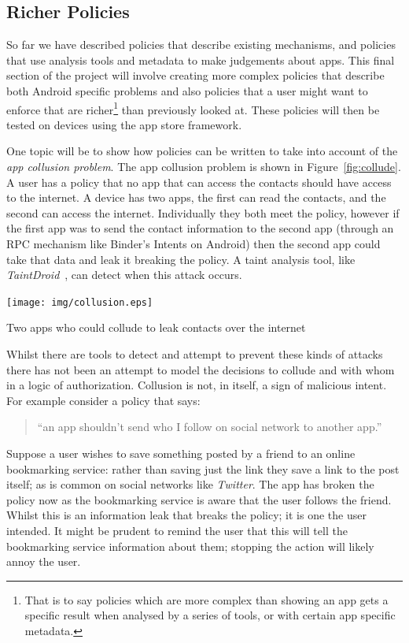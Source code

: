 \documentclass[a4paper]{article}
\begin{document}
\subsection{Richer Policies}

So far we have described policies that describe existing mechanisms, and
policies that use analysis tools and metadata to make judgements about apps.
This final section of the project will involve creating more complex policies
that describe both Android specific problems and also policies that a user might
want to enforce that are richer\footnote{That is to say policies which are more
  complex than showing an app gets a specific result when analysed by a series
  of tools, or with certain app specific metadata.} than previously looked at.
These policies will then be tested on devices using the app store framework.

One topic will be to show how policies can be written to take into account of
the \emph{app collusion problem}.  The app collusion problem is shown in
Figure~\ref{fig:collude}.  A user has a policy that no app that can access the
contacts should have access to the internet.  A device has two apps, the first
can read the contacts, and the second can access the internet.  Individually
they both meet the policy, however if the first app was to send the contact
information to the second app (through an \ac{RPC} mechanism like Binder's
Intents on Android) then the second app could take that data and leak it
breaking the policy.  A taint analysis tool, like
\emph{TaintDroid}~\cite{Enck:2010uw}, can detect when this attack occurs.

\begin{marginfigure}
  \texttt{[image: img/collusion.eps]}
  \caption{Two apps who could collude to leak contacts over the internet}
  \label{fig:collude}
\end{marginfigure}

Whilst there are tools to detect and attempt to prevent these kinds of attacks
there has not been an attempt to model the decisions to collude and with whom in
a logic of authorization.  Collusion is not, in itself, a sign of malicious
intent.  For example consider a policy that says:
\begin{quote}
  ``an app shouldn't send who I follow on social network to another app.''
\end{quote}
Suppose a user wishes to save something posted by a friend to an online
bookmarking service: rather than saving just the link they save a link to the
post itself; as is common on social networks like \emph{Twitter}.  The app has
broken the policy now as the bookmarking service is aware that the user follows
the friend.  Whilst this is an information leak that breaks the policy; it is
one the user intended.  It might be prudent to remind the user that this will
tell the bookmarking service information about them; stopping the action
will likely annoy the user.
\end{document}
